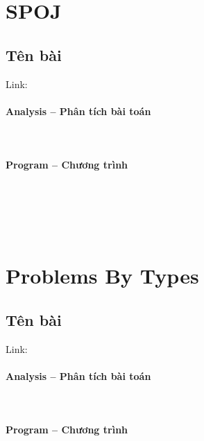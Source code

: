 \documentclass{article}
\begin{document}
\section{SPOJ}

\subsection{Tên bài}
Link: \url{}
 

\paragraph{Analysis -- Phân tích bài toán} \mbox{} \\


\paragraph{Program -- Chương trình} \mbox{} \\


\begin{lstlisting}

	
\end{lstlisting}

\section{Problems By Types}

\subsection{Tên bài}
Link: \url{}
 

\paragraph{Analysis -- Phân tích bài toán} \mbox{} \\


\paragraph{Program -- Chương trình} \mbox{} \\


\begin{lstlisting}

	
\end{lstlisting}

\end{document}
